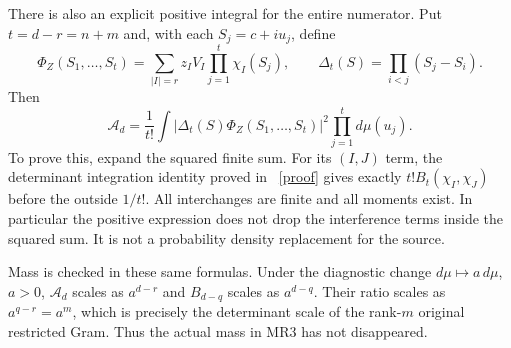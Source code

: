 \documentclass[11pt]{article}
\begin{document}
There is also an explicit positive integral for the entire numerator.
Put $t=d-r=n+m$ and, with each $S_j=c+iu_j$, define
\[
 \Phi_Z(S_1,\ldots,S_t)
    =\sum_{|I|=r}z_IV_I\prod_{j=1}^t\chi_I(S_j),
 \qquad \Delta_t(S)=\prod_{i<j}(S_j-S_i).
\]
Then
\[
 \mathcal A_d=\frac1{t!}\int
      |\Delta_t(S)\Phi_Z(S_1,\ldots,S_t)|^2
                         \prod_{j=1}^t d\mu(u_j).\tag{MR20}
\]
To prove this, expand the squared finite sum. For its $(I,J)$ term,
the determinant integration identity proved in \cite{Mixed}%
~\href{https://github.com/KokunoYumeto/zeta-function-research-reader/blob/5992ad50c0f2a06921f1fcaded7b4e38097c0739/workbenches/splitzero-tandem/continuations/20260920-original-kernel-mixed-determinants/MIXED_CONFLUENT_PROOF.tex\#L1}{[proof]}%
{} gives
exactly $t!B_t(\chi_I,\chi_J)$ before the outside $1/t!$.
All interchanges are finite and all moments exist. In particular the
positive expression does not drop the interference terms inside the
squared sum. It is not a probability density replacement for the source.

Mass is checked in these same formulas. Under the diagnostic change
$d\mu\mapsto a\,d\mu$, $a>0$, $\mathcal A_d$ scales as $a^{d-r}$
and $B_{d-q}$ scales as $a^{d-q}$. Their ratio scales as $a^{q-r}=a^m$,
which is precisely the determinant scale of the rank-$m$ original
restricted Gram. Thus the actual mass in MR3 has not disappeared.
\end{document}
